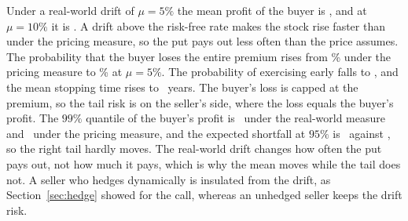 Under a real-world drift of $\mu=5\%$ the mean profit of the buyer is \PnLPmean, and at $\mu=10\%$ it is \PnLPmeanTen.
A drift above the risk-free rate makes the stock rise faster than under the pricing measure, so the put pays out less often than the price assumes.
The probability that the buyer loses the entire premium rises from \PnLQtot\% under the pricing measure to \PnLPtot\% at $\mu=5\%$.
The probability of exercising early falls to \PnLPpex, and the mean stopping time rises to \PnLPtau\ years.
The buyer's loss is capped at the premium, so the tail risk is on the seller's side, where the loss equals the buyer's profit.
The $99\%$ quantile of the buyer's profit is \PnLPqNinetyNine\ under the real-world measure and \PnLQqNinetyNine\ under the pricing measure, and the expected shortfall at $95\%$ is \PnLPes\ against \PnLQes, so the right tail hardly moves.
The real-world drift changes how often the put pays out, not how much it pays, which is why the mean moves while the tail does not.
A seller who hedges dynamically is insulated from the drift, as Section~\ref{sec:hedge} showed for the call, whereas an unhedged seller keeps the drift risk.
